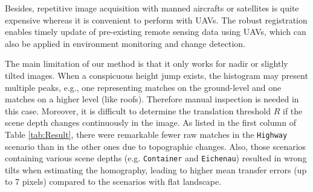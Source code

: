 Besides, repetitive image acquisition with manned aircrafts or satellites is quite expensive whereas it is convenient to perform with UAVs. The robust registration enables timely update of pre-existing remote sensing data using UAVs, which can also be applied in environment monitoring and change detection. 

The main limitation of our method is that it only works for nadir or slightly tilted images. 
When a conspicuous height jump exists, the histogram may present multiple peaks, e.g., one representing matches on the ground-level and one matches on a higher level (like roofs).
Therefore manual inspection is needed in this case. 
Moreover, it is difficult to determine the translation threshold $R$ if the scene depth changes continuously in the image. 
As listed in the first column of Table \ref{tab:Result}, there were remarkable fewer raw matches in the \texttt{Highway} scenario than in the other ones due to topographic changes.
Also, those scenarios containing various scene depths (e.g. \texttt{Container} and \texttt{Eichenau}) resulted in wrong tilts when estimating the homography, leading to higher mean transfer errors (up to 7 pixels) compared to the scenarios with flat landscape.




